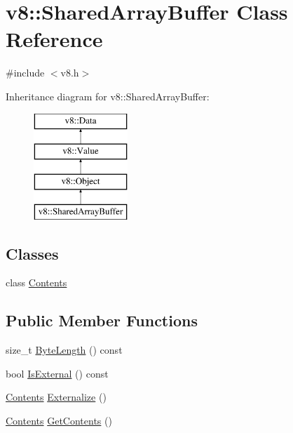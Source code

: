 \hypertarget{classv8_1_1_shared_array_buffer}{}\section{v8\+:\+:Shared\+Array\+Buffer Class Reference}
\label{classv8_1_1_shared_array_buffer}


{\ttfamily \#include $<$v8.\+h$>$}

Inheritance diagram for v8\+:\+:Shared\+Array\+Buffer\+:\begin{figure}[H]
\begin{center}
\leavevmode
\includegraphics[height=4.000000cm]{classv8_1_1_shared_array_buffer}
\end{center}
\end{figure}
\subsection*{Classes}
\begin{DoxyCompactItemize}
\item 
class \hyperlink{classv8_1_1_shared_array_buffer_1_1_contents}{Contents}
\end{DoxyCompactItemize}
\subsection*{Public Member Functions}
\begin{DoxyCompactItemize}
\item 
size\+\_\+t \hyperlink{classv8_1_1_shared_array_buffer_a09cfb461e2f3f8e1fca53a4a2fbfd8df}{Byte\+Length} () const 
\item 
bool \hyperlink{classv8_1_1_shared_array_buffer_a37e7ba1ed5a1422af9928697ea6a960b}{Is\+External} () const 
\item 
\hyperlink{classv8_1_1_shared_array_buffer_1_1_contents}{Contents} \hyperlink{classv8_1_1_shared_array_buffer_a5e3308ea38c81c37d5c3fc08fc1a6696}{Externalize} ()
\item 
\hyperlink{classv8_1_1_shared_array_buffer_1_1_contents}{Contents} \hyperlink{classv8_1_1_shared_array_buffer_a7267c4156bea02154afa6c8fc5b1f4d8}{Get\+Contents} ()
\end{DoxyCompactItemize}
